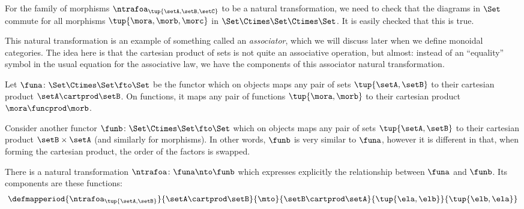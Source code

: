 \begin{example}
    For the family of morphisms $\ntrafoa_{\tup{\setA, \setB, \setC}}$ to be a natural transformation, we need to check that the diagrams
    in $\Set$ commute for all morphisms $\tup{\mora, \morb, \morc}$ in $\Set \Ctimes \Set \Ctimes \Set$.
    It is easily checked that this is true.

    This natural transformation is an example of something called an \emph{associator}, which we will discuss later when we define monoidal categories.
    The idea here is that the cartesian product of sets is not quite an associative operation, but almost: instead of an ``equality'' symbol in the usual equation for the associative law, we have the components of this associator natural transformation.
\end{example}


\begin{example}
    Let $\funa \colon \Set \Ctimes \Set \fto \Set$ be the functor which on objects maps any pair of sets $\tup{\setA, \setB}$ to their cartesian product $\setA \cartprod \setB$.
    On functions, it maps any pair of functions $\tup{\mora, \morb}$ to their cartesian product $\mora \funcprod \morb$.

    Consider another functor $\funb \colon \Set \Ctimes \Set \fto \Set$ which on objects maps any pair of sets $\tup{\setA, \setB}$ to their cartesian product $\setB \times \setA$ (and similarly for morphisms).
    In other words, $\funb$ is very similar to $\funa$, however it is different in that, when forming the cartesian product, the order of the factors is swapped.

    There is a natural transformation $\ntrafoa \colon \funa \nto \funb$ which expresses explicitly the relationship between $\funa$ and $\funb$.
    Its components are these functions:
    \begin{equation}\label{eq:symmetry-nat-trafo}
        \defmapperiod{\ntrafoa_{\tup{\setA, \setB}}}{\setA \cartprod \setB}{\mto }{\setB \cartprod \setA}{\tup{\ela, \elb}}{\tup{\elb, \ela}}
    \end{equation}

\end{example}

